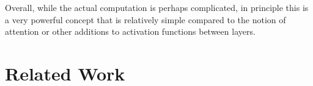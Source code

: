 \documentclass[11pt,a4paper]{article}
\begin{document}
Overall, while the actual computation is perhaps complicated, in principle this is a very powerful concept that is relatively simple compared to the notion of attention or other additions to activation functions between layers.


% 


\section{Related Work}
\end{document}
